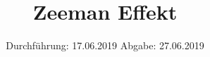

\subject{Versuch 27}
\title{Zeeman Effekt}
\date{%
  Durchführung: 17.06.2019
  \hspace{3em}
  Abgabe: 27.06.2019
}



\maketitle
\thispagestyle{empty}
\tableofcontents
\newpage






\printbibliography{}


